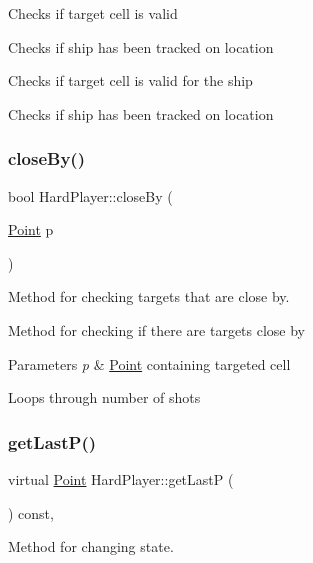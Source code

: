 Checks if target cell is valid

Checks if ship has been tracked on location

Checks if target cell is valid for the ship

Checks if ship has been tracked on location \mbox{\label{class_hard_player_a91cdd6239e111ea02bff561f6a3a0c41}} 
\subsubsection{\texorpdfstring{close\+By()}{closeBy()}}
{\footnotesize\ttfamily bool Hard\+Player\+::close\+By (\begin{DoxyParamCaption}\item[{\mbox{\hyperlink{class_point}{Point}}}]{p }\end{DoxyParamCaption})}



Method for checking target\textquotesingle{}s that are close by. 

Method for checking if there are targets close by 
\begin{DoxyParams}{Parameters}
{\em p} & \mbox{\hyperlink{class_point}{Point}} containing targeted cell \\
\hline
\end{DoxyParams}
Loops through number of shots \mbox{\label{class_hard_player_ad86f7d42434ae5526d7a1ca4ea65b51a}} 
\subsubsection{\texorpdfstring{get\+Last\+P()}{getLastP()}}
{\footnotesize\ttfamily virtual \mbox{\hyperlink{class_point}{Point}} Hard\+Player\+::get\+LastP (\begin{DoxyParamCaption}{ }\end{DoxyParamCaption}) const\hspace{0.3cm}{\ttfamily [inline]}, {\ttfamily [virtual]}}



Method for changing state. 

\mbox{\label{class_hard_player_a063d9f4071b687339fbc134239771ef3}} 
